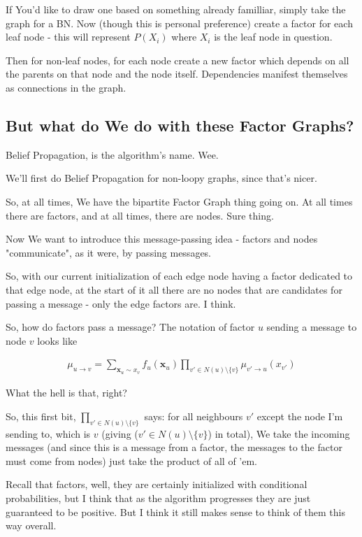 \documentclass{article}
\begin{document}
		If You'd like to draw one based on something already familliar, simply take the graph for a BN. Now (though this is personal preference) create a factor for each leaf node - this will represent $P(X_i)$ where $X_i$ is the leaf node in question.
		
		Then for non-leaf nodes, for each node create a new factor which depends on all the parents on that node and the node itself. Dependencies manifest themselves as connections in the graph.
		
	\subsection{But what do We do with these Factor Graphs?}
		
		Belief Propagation, is the algorithm's name. Wee.
		
		We'll first do Belief Propagation for non-loopy graphs, since that's nicer.
		
		So, at all times, We have the bipartite Factor Graph thing going on. At all times there are factors, and at all times, there are nodes. Sure thing.
		
		Now We want to introduce this message-passing idea - factors and nodes "communicate", as it were, by passing messages. 
		
		So, with our current initialization of each edge node having a factor dedicated to that edge node, at the start of it all there are no nodes that are candidates for passing a message - only the edge factors are. I think.
		
		So, how do factors pass a message? The notation of factor $u$ sending a message to node $v$ looks like
		
		\begin{align}
			\mu_{u\to v} = \sum_{\mathbf{x}_u\sim x_v} f_u(\mathbf{x}_u) \prod_{v'\in N(u)\setminus\{v\}} \mu_{v'\to u}(x_{v'})
		\end{align}
		
		What the hell is that, right?
		
		So, this first bit, $\prod_{v'\in N(u)\setminus\{v\}}$ says: for all neighbours $v'$ except the node I'm sending to, which is $v$ (giving ($v'\in N(u)\setminus\{v\}$) in total), We take the incoming messages (and since this is a message from a factor, the messages to the factor must come from nodes) just take the product of all of 'em. 
		
		Recall that factors, well, they are certainly initialized with conditional probabilities, but I think that as the algorithm progresses they are just guaranteed to be positive. But I think it still makes sense to think of them this way overall. 
		
\end{document}
